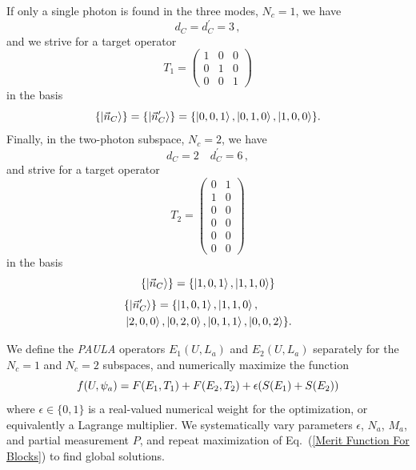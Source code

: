 \documentclass[aps,pra,twocolumn,showpacs,superscriptaddress,floatfix,10pt]{revtex4}
\begin{document}
If only a single photon is found in the three modes, $N_c=1$, we have
\begin{equation}
d_C = d_C^\prime = 3\,,
\end{equation}
and we strive for a target operator
\begin{equation}
\label{T1 1C2T}
T_1=	\begin{pmatrix} 1 & 0 & 0  \\ 0 & 1 & 0  \\ 0 & 0 & 1   \end{pmatrix}  
\end{equation}
in the basis
\begin{equation}
\{ \ket{\vec{n}_C} \} = \{ \ket{\vec{n}_C^\prime} \} = \{ \ket{0,0,1},\ket{0,1,0},\ket{1,0,0} \}.
\end{equation}
Finally, in the two-photon subspace, $N_c=2$, we have
\begin{equation}
d_C = 2 \quad d_C^\prime = 6 \,,
\end{equation}
and strive for a target operator 
\begin{equation}
\label{T2 1C2T}
T_2=\begin{pmatrix} 0 & 1  \\ 1 & 0  \\ 0 & 0 \\ 0 & 0 \\ 0 & 0 \\ 0 & 0   \end{pmatrix}  
\end{equation}
in the basis
\begin{equation}
\{ \ket{\vec{n}_C} \} = \{ \ket{1,0,1},\ket{1,1,0} \}
\end{equation}
\begin{eqnarray}
& \{ \ket{\vec{n}^\prime_C } \} = \{ \ket{1,0,1},\ket{1,1,0}, \\ &\ket{2,0,0},\ket{0,2,0},\ket{0,1,1},\ket{0,0,2} \}. \nonumber
\end{eqnarray}

We define the \textit{PAULA} operators  $E_1(U,L_a)$ and  $E_2(U,L_a)$ separately for the $N_c=1$ and $N_c=2$ subspaces,
and numerically maximize the function
\begin{equation}
\label{Merit Function For Blocks}
\small f(U,\psi_a) = F(E_1,T_1) + F(E_2,T_2) +\epsilon (S(E_1) + S(E_2) )
\end{equation}
where $\epsilon \in \{0,1\}$ is a real-valued numerical weight for the optimization, or equivalently a Lagrange multiplier. We systematically vary parameters $\epsilon$, $N_a$, $M_a$, and partial measurement $P$, and repeat maximization of Eq.~(\ref{Merit Function For Blocks}) to find global solutions.
\end{document}
